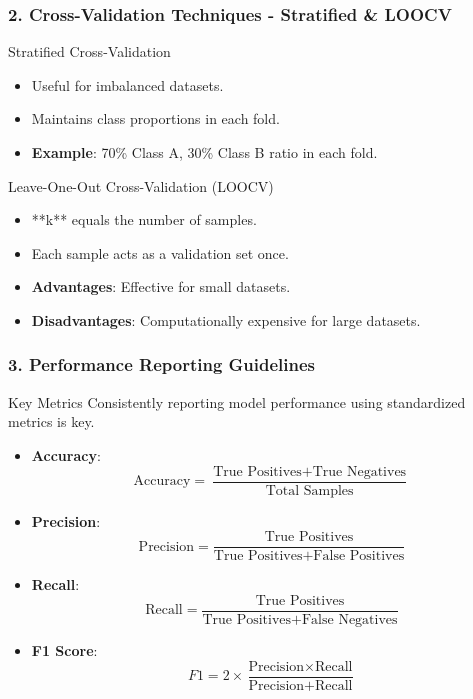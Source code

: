 \documentclass{beamer}
\begin{document}
\begin{frame}[fragile]
    \frametitle{2. Cross-Validation Techniques - Stratified & LOOCV}
    \begin{block}{Stratified Cross-Validation}
        \begin{itemize}
            \item Useful for imbalanced datasets.
            \item Maintains class proportions in each fold.
            \item \textbf{Example}: 70\% Class A, 30\% Class B ratio in each fold.
        \end{itemize}
    \end{block}

    \begin{block}{Leave-One-Out Cross-Validation (LOOCV)}
        \begin{itemize}
            \item **k** equals the number of samples.
            \item Each sample acts as a validation set once.
            \item \textbf{Advantages}: Effective for small datasets.
            \item \textbf{Disadvantages}: Computationally expensive for large datasets.
        \end{itemize}
    \end{block}
\end{frame}

\begin{frame}[fragile]
    \frametitle{3. Performance Reporting Guidelines}
    \begin{block}{Key Metrics}
        Consistently reporting model performance using standardized metrics is key.
        \begin{itemize}
            \item \textbf{Accuracy}:
            \[
            \text{Accuracy} = \frac{\text{True Positives} + \text{True Negatives}}{\text{Total Samples}}
            \]

            \item \textbf{Precision}:
            \[
            \text{Precision} = \frac{\text{True Positives}}{\text{True Positives} + \text{False Positives}}
            \]

            \item \textbf{Recall}:
            \[
            \text{Recall} = \frac{\text{True Positives}}{\text{True Positives} + \text{False Negatives}}
            \]

            \item \textbf{F1 Score}:
            \[
            F1 = 2 \times \frac{\text{Precision} \times \text{Recall}}{\text{Precision} + \text{Recall}}
            \]
        \end{itemize}
    \end{block}
\end{frame}
\end{document}
